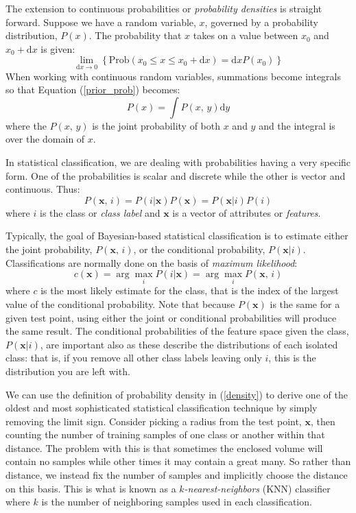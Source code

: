 \documentclass{article}
\renewcommand{\vec}[1]{\boldsymbol{#1}}
\begin{document}
The extension to continuous probabilities or {\it probability densities} is
straight forward.
Suppose we have a random variable, $x$, governed by a probability distribution,
$P(x)$.
The probability that $x$ takes on a value between $x_0$ and $x_0+\mathrm d x$ is
given:
\begin{equation}
	\lim_{\mathrm d x \rightarrow 0} \left \lbrace \mathrm{Prob}(x_0 \le x \le x_0+\mathrm d x) = \mathrm d x P(x_0) \right \rbrace
	\label{density}
\end{equation}
When working with continuous random variables, summations become integrals
so that Equation (\ref{prior_prob}) becomes:
\begin{equation}
	P(x) = \int P(x,\, y) \mathrm d y
\end{equation}
where the $P(x,\,y)$ is the joint probability of both $x$ and $y$ and the 
integral is over the domain of $x$.

In statistical classification, we are dealing with probabilities
having a very specific form.
One of the probabilities is scalar and discrete while the other is vector
and continuous. Thus:
\begin{equation}
	P(\vec x, \, i) = P (i|\vec x) P(\vec x) = P(\vec x|i) P(i)
\end{equation}
where $i$ is the class or {\it class label} and $\vec x$ is a vector of 
attributes or {\it features}.

Typically, the goal of Bayesian-based statistical classification is to
estimate either the joint probability, $P(\vec x, \, i)$, or the conditional
probability, $P(\vec x| i)$.
Classifications are normally done on the basis of {\it maximum likelihood}:
\begin{equation}
	c (\vec x) = \arg \max_i P(i|\vec x) = \arg \max_i P(\vec x,\, i)
\end{equation}
where $c$ is the most likely estimate for the class, that is the index
of the largest value of the conditional probability.
Note that because $P(\vec x)$ is the same for a given test point, using
either the joint or conditional probabilities will produce the same result.
The conditional probabilities of the feature space given the class, 
$P(\vec x|i)$, are important also as these 
describe the distributions of each isolated class: that is, if you remove all 
other class labels leaving only $i$, this is the distribution you are left with.

We can use the definition of probability density in (\ref{density}) to derive one of the oldest and
most sophisticated statistical classification technique by simply removing
the limit sign.
Consider picking a radius from the test point, $\vec x$, then
counting the number of training samples of one class or another within
that distance.
The problem with this is that sometimes the enclosed volume will contain 
no samples while other times it may contain a great many.
So rather than distance, we instead fix the number of samples and implicitly
choose the distance on this basis.
This is what is known as a {\it $k$-nearest-neighbors} (KNN) classifier where $k$
is the number of neighboring samples used in each classification.
\end{document}
